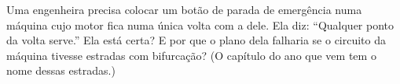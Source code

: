 \begin{exercise}[$\star\star$]\label{exo:g4:series-circuits:11}
Uma engenheira precisa colocar um botão de parada de emergência numa
máquina cujo motor fica numa única volta com a  dele. Ela diz:
``Qualquer ponto da volta serve.'' Ela está certa? E por que o plano
dela falharia se o circuito da máquina tivesse estradas com
bifurcação? (O capítulo do ano que vem tem o nome dessas estradas.)
\end{exercise}
